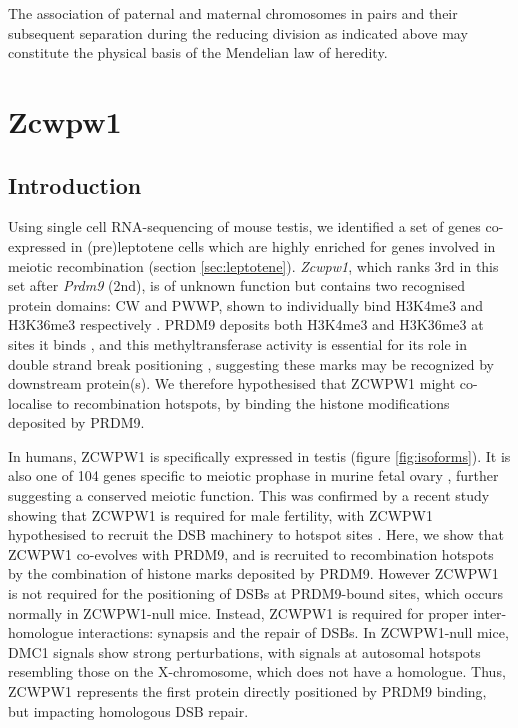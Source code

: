 \begin{savequote}[8cm]
	The association of paternal and maternal chromosomes in pairs and their subsequent separation during the reducing division as indicated above may constitute the physical basis of the Mendelian law of heredity.
\end{savequote}

\chapter{\label{ch:3-Zcw} Zcwpw1}

\minitoc

\section{Introduction}

Using single cell RNA-sequencing of mouse testis, we identified a set of genes co-expressed in (pre)leptotene cells which are highly enriched for genes involved in meiotic recombination (section \ref{sec:leptotene}).
\textit{Zcwpw1}, which ranks 3rd in this set after \textit{Prdm9} (2nd), is of unknown function but contains two recognised protein domains: CW and PWWP, shown to individually bind H3K4me3 and H3K36me3 respectively \parencite{He2010Complex, Rona2016PWWP}.
PRDM9 deposits both H3K4me3 and H3K36me3 at sites it binds \parencite{Powers2016Meiotic}, and this methyltransferase activity is essential for its role in double strand break positioning \parencite{Diagouraga2018PRDM9}, suggesting these marks may be recognized by downstream protein(s).
We therefore hypothesised that ZCWPW1 might co-localise to recombination hotspots, by binding the histone modifications deposited by PRDM9.

In humans, ZCWPW1 is specifically expressed in testis \parencite{Carithers2015novel, Uhlen2015Tissuebased} (figure \ref{fig:isoforms}).
It is also one of 104 genes specific to meiotic prophase in murine fetal ovary \parencite{Soh2015Gene}, further suggesting a conserved meiotic function.
This was confirmed by a recent study showing that ZCWPW1 is required for male fertility, with ZCWPW1 hypothesised to recruit the DSB machinery to hotspot sites \parencite{Li2019histone}.
Here, we show that ZCWPW1 co-evolves with PRDM9, and is recruited to recombination hotspots by the combination of histone marks deposited by PRDM9.
However ZCWPW1 is not required for the positioning of DSBs at PRDM9-bound sites, which occurs normally in ZCWPW1-null mice.
Instead, ZCWPW1 is required for proper inter-homologue interactions: synapsis and the repair of DSBs.
In ZCWPW1-null mice, DMC1 signals show strong perturbations, with signals at autosomal hotspots resembling those on the X-chromosome, which does not have a homologue.
Thus, ZCWPW1 represents the first protein directly positioned by PRDM9 binding, but impacting homologous DSB repair.

